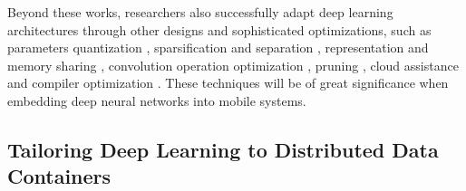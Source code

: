 \documentclass[journal,comsoc,letter]{IEEEtran}
\begin{document}
Beyond these works, researchers also successfully adapt deep learning architectures through other designs and sophisticated optimizations, such as parameters quantization \cite{wu2016quantized, zen2016fast}, sparsification and separation \cite{bhattacharya2016sparsification}, representation and memory sharing \cite{georgiev2017low, falcao2017evaluation}, convolution operation optimization \cite{cho2017mec}, pruning \cite{guo2017pruning}, cloud assistance \cite{li2017fitcnn} and compiler optimization \cite{chen2018tvm}. These techniques will be of great significance when embedding deep neural networks into mobile systems.



\subsection{Tailoring Deep Learning to Distributed Data Containers}
\end{document}
